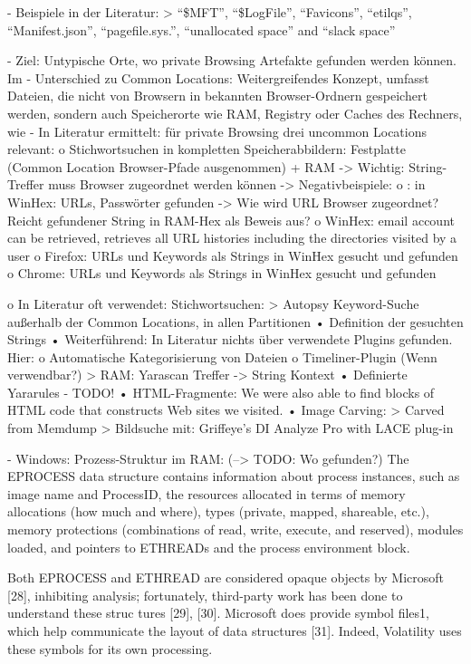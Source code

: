 	- Beispiele in der Literatur:
	> “\$MFT”, “\$LogFile”, “Favicons”, “etilqs”, “Manifest.json”, “pagefile.sys.”, “unallocated space” and “slack space” \cite{Montasari.2015}	
	
	-	Ziel: Untypische Orte, wo private Browsing Artefakte gefunden werden können. Im
	-	Unterschied zu Common Locations: Weitergreifendes Konzept, umfasst Dateien, die nicht von Browsern in bekannten Browser-Ordnern gespeichert werden, sondern auch Speicherorte wie RAM, Registry oder Caches des Rechners, wie 
	-	In Literatur ermittelt: für private Browsing drei uncommon Locations relevant:
	o	Stichwortsuchen in kompletten Speicherabbildern: Festplatte (Common Location Browser-Pfade ausgenommen) + RAM 
	-> Wichtig: String-Treffer muss Browser zugeordnet werden können
	-> Negativbeispiele:
	o \cite{Rochmadi.2017}: in WinHex: URLs, Passwörter gefunden -> Wie wird URL Browser zugeordnet? Reicht gefundener String in RAM-Hex als Beweis aus?
	o \cite{Md.2018} WinHex: email account can be retrieved, retrieves all URL histories including the directories visited by a user
	o \cite{Montasari.2015}	Firefox: URLs und Keywords als Strings in WinHex gesucht und gefunden 
	o \cite{Montasari.2015}	Chrome: URLs und Keywords als Strings in WinHex gesucht und gefunden
	
o	In Literatur oft verwendet: Stichwortsuchen:
	>	Autopsy Keyword-Suche außerhalb der Common Locations, in allen Partitionen
		•	Definition der gesuchten Strings
		•	Weiterführend:  In Literatur nichts über verwendete Plugins gefunden. Hier:
			o	Automatische Kategorisierung von Dateien
			o	Timeliner-Plugin (Wenn verwendbar?)
	>	RAM: Yarascan Treffer -> String Kontext
		•	Definierte Yararules
			- TODO!
		•	HTML-Fragmente: \cite{Said.2011} We were also able to find blocks of HTML code that constructs Web sites we visited.
		•	Image Carving: 
	> Carved from Memdump \cite{Ohana.2013}
	> Bildsuche mit: Griffeye’s DI Analyze Pro with LACE plug-in \cite{Horsman.2019}

- Windows: Prozess-Struktur im RAM: 
	(--> TODO: Wo gefunden?)
	The EPROCESS data structure contains information about process instances, such as image name and ProcessID, the resources allocated in terms of memory allocations (how much and where), types (private, mapped, shareable, etc.), memory protections (combinations of read, write, execute, and reserved), modules loaded, and pointers to ETHREADs and the process environment block.
	
	Both EPROCESS and ETHREAD are considered opaque objects by Microsoft [28], inhibiting analysis; fortunately, third-party work has been done to understand these struc tures [29], [30]. Microsoft does provide symbol files1, which help communicate the layout of data structures [31]. Indeed, Volatility uses these symbols for its own processing.
	
